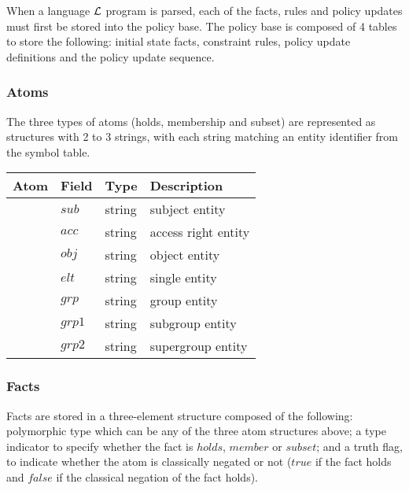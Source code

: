 \documentclass[glov2,twocolumn,final]{svjour2}
\newenvironment{vquote}
  {\begin{list}{}{\leftmargin 1em}\item[]}
  {\end{list}}
\begin{document}
      When a language ${\cal L}$ program is parsed, each of the facts,
      rules and policy updates must first be stored into the policy base.
      The policy base is composed of 4 tables to store the following:
      initial state facts, constraint rules, policy update definitions and
      the policy update sequence.

      \subsubsection{Atoms}

        The three types of atoms (holds, membership and subset) are
        represented as structures with 2 to 3 strings, with each string
        matching an entity identifier from the symbol table.

        \begin{vquote}
          \begin{tabular}[t]{|l|l|l|l|}
            \hline
            \textbf{Atom} & \textbf{Field} & \textbf{Type} & \textbf{Description} \\
            \hline
            {\multirow{3}{*}{holds}} & $sub$ & string & subject entity \\
            \cline{2-4}
            & $acc$ & string & access right entity \\
            \cline{2-4}
            & $obj$ & string & object entity \\
            \hline
            \hline
            {\multirow{2}{*}{member}} & $elt$ & string & single entity \\
            \cline{2-4}
            & $grp$ & string & group entity \\
            \hline
            \hline
            {\multirow{2}{*}{subset}} & $grp1$ & string & subgroup entity \\
            \cline{2-4}
            & $grp2$ & string & supergroup entity \\
            \hline
          \end{tabular}
        \end{vquote}

      \subsubsection{Facts}

        Facts are stored in a three-element structure composed of the
        following: polymorphic type which can be any of the three atom
        structures above; a type indicator to specify whether the fact is
        $holds$, $member$ or $subset$; and a truth flag, to indicate whether the
        atom is classically negated or not ($true$ if the fact holds
        and $false$ if the classical negation of the fact holds).
\end{document}
